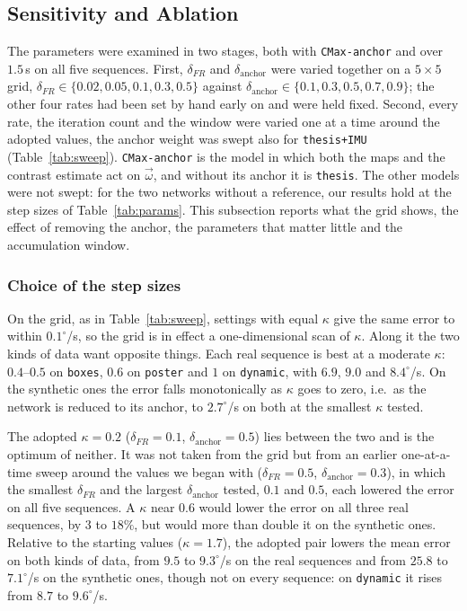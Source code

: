\documentclass[journal]{IEEEtran}
\newcommand{\wvec}{\vec{\omega}}
\begin{document}
\subsection{Sensitivity and Ablation}
\label{sec:sensitivity}
The parameters were examined in two stages, both with \texttt{CMax-anchor} and over $1.5$\,s on all five sequences. First, $\delta_{F\!R}$ and $\delta_{\text{anchor}}$ were varied together on a $5\times5$ grid, $\delta_{F\!R} \in \{0.02, 0.05, 0.1, 0.3, 0.5\}$ against $\delta_{\text{anchor}} \in \{0.1, 0.3, 0.5, 0.7, 0.9\}$; the other four rates had been set by hand early on and were held fixed. Second, every rate, the iteration count and the window were varied one at a time around the adopted values, the anchor weight was swept also for \texttt{thesis+IMU} (Table~\ref{tab:sweep}). \texttt{CMax-anchor} is the model in which both the maps and the contrast estimate act on $\wvec$, and without its anchor it is \texttt{thesis}. The other models were not swept: for the two networks without a reference, our results hold at the step sizes of Table~\ref{tab:params}. This subsection reports what the grid shows, the effect of removing the anchor, the parameters that matter little and the accumulation window.

\subsubsection{Choice of the step sizes}
\label{sec:realvssynth}
On the grid, as in Table~\ref{tab:sweep}, settings with equal $\kappa$ give the same error to within $0.1^\circ$/s, so the grid is in effect a one-dimensional scan of $\kappa$. Along it the two kinds of data want opposite things. Each real sequence is best at a moderate $\kappa$: $0.4$--$0.5$ on \texttt{boxes}, $0.6$ on \texttt{poster} and $1$ on \texttt{dynamic}, with $6.9$, $9.0$ and $8.4^\circ$/s. On the synthetic ones the error falls monotonically as $\kappa$ goes to zero, i.e.\ as the network is reduced to its anchor, to $2.7^\circ$/s on both at the smallest $\kappa$ tested.

The adopted $\kappa = 0.2$ ($\delta_{F\!R} = 0.1$, $\delta_{\text{anchor}} = 0.5$) lies between the two and is the optimum of neither. It was not taken from the grid but from an earlier one-at-a-time sweep around the values we began with ($\delta_{F\!R} = 0.5$, $\delta_{\text{anchor}} = 0.3$), in which the smallest $\delta_{F\!R}$ and the largest $\delta_{\text{anchor}}$ tested, $0.1$ and $0.5$, each lowered the error on all five sequences. A $\kappa$ near $0.6$ would lower the error on all three real sequences, by $3$ to $18\%$, but would more than double it on the synthetic ones. Relative to the starting values ($\kappa = 1.7$), the adopted pair lowers the mean error on both kinds of data, from $9.5$ to $9.3^\circ$/s on the real sequences and from $25.8$ to $7.1^\circ$/s on the synthetic ones, though not on every sequence: on \texttt{dynamic} it rises from $8.7$ to $9.6^\circ$/s.
\end{document}
